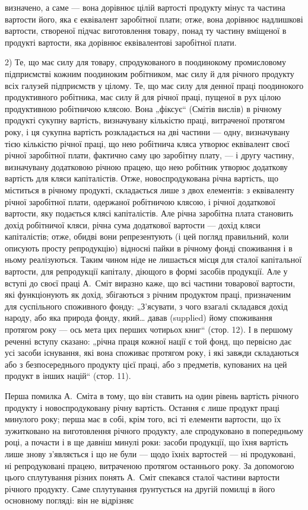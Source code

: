 \parcont{}  %
визначено, а саме — вона дорівнює цілій вартості продукту мінус та частина вартости його, яка є
еквівалент заробітної плати; отже, вона дорівнює надлишкові вартости, створеної підчас виготовлення
товару, понад ту частину вміщеної в продукті вартости, яка дорівнює еквівалентові заробітної плати.

2) Те, що має силу для товару, спродукованого в поодинокому промисловому підприємстві кожним
поодиноким робітником, має силу й для річного продукту всіх галузей підприємств у цілому. Те, що має
силу для денної праці поодинокого продуктивного робітника, має силу й для річної праці, пущеної в
рух цілою продуктивною робітничою клясою. Вона „фіксує“ (Смітів вислів) в річному продукті сукупну
вартість, визначувану кількістю праці, витраченої протягом року, і ця сукупна вартість розкладається
на дві частини — одну, визначувану тією кількістю річної праці, що нею робітнича кляса утворює
еквівалент своєї річної заробітної плати, фактично саму цю заробітну плату, — і другу частину,
визначувану додатковою річною працею, що нею робітник утворює додаткову вартість для кляси
капіталістів. Отже, новоспродукована річна вартість, що міститься в річному продукті, складається
лише з двох елементів: з еквіваленту річної заробітної плати, одержаної робітничою клясою, і
річної додаткової вартости, яку подається клясі капіталістів. Але річна заробітна плата становить
дохід робітничої кляси, річна сума додаткової вартости — дохід кляси капіталістів; отже, обидві вони
репрезентують (і цей погляд правильний, коли описують просту репродукцію) відносні пайки в річному
фонді споживання і в ньому реалізуються. Таким чином ніде не лишається місця для сталої капітальної
вартости, для репродукції капіталу, діющого в формі засобів продукції. Але у вступі до своєї праці
А.~Сміт виразно каже, що всі частини товарової вартости, які функціонують як дохід, збігаються з
річним продуктом праці, призначеним для суспільного споживного фонду: „З’ясувати, з чого взагалі
складався дохід народу, або яка природа фонду, який\dots{} давав (supplied) йому споживання протягом
року — ось мета цих перших чотирьох книг“ (стор. 12). І в першому реченні вступу сказано: „річна
праця кожної нації є той фонд, що первісно дає усі засоби існування, які вона споживає протягом
року, і які завжди складаються або з безпосереднього продукту цієї праці, або з предметів, купованих
на цей продукт в інших націй“ (стор. 11).

Перша помилка А.~Сміта в тому, що він ставить на один рівень вартість річного продукту і
новоспродуковану річну вартість. Остання є лише продукт праці минулого року; перша має в собі, крім
того, всі ті елементи вартости, що їх зужитковано на виготовлення річного продукту, але спродуковано
в попередньому році, а почасти і в ще давніш минулі роки: засоби продукції, що їхня вартість лише
знову з’являється і що не були — щодо їхніх вартостей — ні продуковані, ні репродуковані працею,
витраченою протягом останнього року. За допомогою цього сплутування різних понять А.~Сміт
спекався сталої частини вартости річного продукту. Саме сплутування ґрунтується на другій помилці в
його основному погляді: він не відрізняє
\parbreak{}  %

